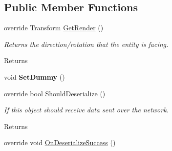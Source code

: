 \subsection*{Public Member Functions}
\begin{DoxyCompactItemize}
\item 
\hypertarget{class_skyrates_1_1_client_1_1_entity_1_1_entity_player_ship_a174748de79e607b04d0a319684b87a80}{override Transform \hyperlink{class_skyrates_1_1_client_1_1_entity_1_1_entity_player_ship_a174748de79e607b04d0a319684b87a80}{Get\-Render} ()}\label{class_skyrates_1_1_client_1_1_entity_1_1_entity_player_ship_a174748de79e607b04d0a319684b87a80}

\begin{DoxyCompactList}\small\item\em Returns the direction/rotation that the entity is facing. 

\begin{DoxyReturn}{Returns}

\end{DoxyReturn}
 \end{DoxyCompactList}\item 
\hypertarget{class_skyrates_1_1_client_1_1_entity_1_1_entity_player_ship_a20c534da8e4fac292800c1e2f4d78f8c}{void {\bfseries Set\-Dummy} ()}\label{class_skyrates_1_1_client_1_1_entity_1_1_entity_player_ship_a20c534da8e4fac292800c1e2f4d78f8c}

\item 
\hypertarget{class_skyrates_1_1_client_1_1_entity_1_1_entity_player_ship_acd0bc1462d5fc25e38969f62877d63b6}{override bool \hyperlink{class_skyrates_1_1_client_1_1_entity_1_1_entity_player_ship_acd0bc1462d5fc25e38969f62877d63b6}{Should\-Deserialize} ()}\label{class_skyrates_1_1_client_1_1_entity_1_1_entity_player_ship_acd0bc1462d5fc25e38969f62877d63b6}

\begin{DoxyCompactList}\small\item\em If this object should receive data sent over the network. 

\begin{DoxyReturn}{Returns}

\end{DoxyReturn}
 \end{DoxyCompactList}\item 
\hypertarget{class_skyrates_1_1_client_1_1_entity_1_1_entity_player_ship_a150a965f25b65c885fa7629d99e25286}{override void \hyperlink{class_skyrates_1_1_client_1_1_entity_1_1_entity_player_ship_a150a965f25b65c885fa7629d99e25286}{On\-Deserialize\-Success} ()}\label{class_skyrates_1_1_client_1_1_entity_1_1_entity_player_ship_a150a965f25b65c885fa7629d99e25286}


\end{DoxyCompactItemize}

